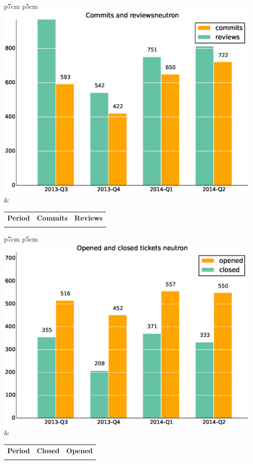\documentclass[a4wide,11pt]{report}
\begin{document}
\begin{tabular}{p{7cm} p{5cm}}
    \vspace{0pt} 
    \includegraphics[scale=.35]{figs/commitsneutron.eps}
    & 
    \vspace{0pt}
    \begin{tabular}{l|r|r|}%
    \bfseries Period & \bfseries Commits & \bfseries Reviews %
    \csvreader[head to column names]{data/commitsneutron.csv}{}%
    {\\ & \commits & \submitted}
    \end{tabular}
\end{tabular}

\begin{tabular}{p{7cm} p{5cm}}
    \vspace{0pt} 
    \includegraphics[scale=.35]{figs/closedneutron.eps}
    & 
    \vspace{0pt}
    \begin{tabular}{l|r|r|}%
    \bfseries Period & \bfseries Closed & \bfseries Opened
    \csvreader[head to column names]{data/closedneutron.csv}{}%
    {\\ & \closed & \opened}
    \end{tabular}
\end{tabular}
\end{document}
